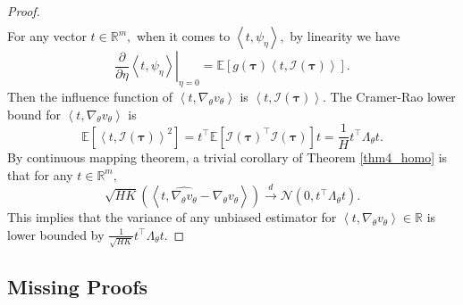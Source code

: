 \documentclass{article}
\numberwithin{equation}{section}
\begin{document}
\begin{proof}
\begin{align*}
\end{align*}
For any vector $t \in \mathbb{R}^m,$ when it comes to $\left\langle t,\psi_{\eta}\right\rangle,$ by linearity we have
\begin{equation*}
    \left.\frac{\partial}{\partial \eta} \left\langle t,\psi_{\eta}\right\rangle\right|_{\eta=0}=\mathbb{E}[g(\boldsymbol{\tau}) \left\langle t,\mathcal{I}(\boldsymbol{\tau})\right\rangle].
\end{equation*}
Then the influence function of $\left\langle t,\nabla_{\theta}v_{\theta}\right\rangle$ is $\left\langle t,\mathcal{I}(\boldsymbol{\tau})\right\rangle.$ The Cramer-Rao lower bound for $\left\langle t,\nabla_{\theta}v_{\theta}\right\rangle$ is
\begin{equation*}
    \mathbb{E}\left[\left\langle t,\mathcal{I}(\boldsymbol{\tau})\right\rangle^2\right] = t^{\top} \mathbb{E}\left[\mathcal{I}(\boldsymbol{\tau})^{\top}\mathcal{I}(\boldsymbol{\tau})\right] t = \frac{1}{H}t^{\top} \Lambda_{\theta} t.
\end{equation*}
By continuous mapping theorem, a trivial corollary of Theorem \ref{thm4_homo} is that for any $t \in \mathbb{R}^m,$
\begin{equation*}
    \sqrt{HK}\left(\left\langle t,\widehat{\nabla_{\theta} v_{\theta}}-\nabla_{\theta} v_{\theta}\right\rangle\right) \stackrel{d}{\rightarrow} \mathcal{N}\left(0, t^{\top} \Lambda_{\theta} t\right).
\end{equation*} 
This implies that the variance of any unbiased estimator for $\left\langle t, \nabla_{\theta} v_{\theta} \right\rangle \in \mathbb{R}$ is lower bounded by $\frac{1}{\sqrt{HK}}t^{\top} \Lambda_{\theta} t.$
\end{proof}

\subsection{Missing Proofs}
\label{missing_proof_homo}
\end{document}
